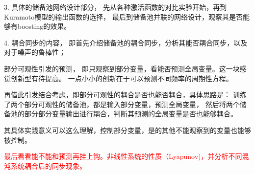 \documentclass[notitlepage,cs4size,punct,oneside]{ctexrep}
\numberwithin{equation}{chapter}
\theoremstyle{mystyle}
\begin{document}
\bigskip

3. 具体的储备池网络设计部分，
先从各种激活函数的对比实验开始，再到Kuramoto模型的输出函数的选择，
最后到储备池并联的网络设计，观察其是否能够有boosting的效果。

\bigskip

4. 耦合同步的内容，
即首先介绍储备池的耦合同步，分析其能否耦合同步，以及对于噪声的鲁棒性；

部分可观性引发的预测，
即只观察到部分变量，看能否预测全局变量。这一块感觉创新型有待提高。
一点小小的创新在于可以预测不同频率的周期性方程。

再借此引发结合考虑，即部分可观性的耦合是否也能否耦合，具体思路是：
训练了两个部分可观性的储备池，都是输入部分变量，预测全局变量，
然后将两个储备池的部分部分变量输出进行耦合，判断其预测的全局变量是否也能够耦合。

其具体实践意义可以这么理解，控制部分变量，是的其他不能观察到的变量也能够被控制。

\textcolor{red}{最后看看能不能和预测再挂上钩。非线性系统的性质（Lyapunov)，并分析不同混沌系统耦合后的同步现象。}

\end{document}
